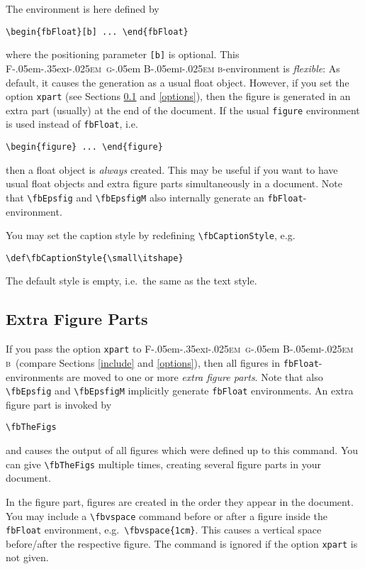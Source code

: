 \documentclass{ltxdoc}
\def\FigBib{{\rmfamily F\kern-.05em\lower-.35ex\hbox{\textsc{i\kern-.025em g}}\kern-.05em%
    B\kern-.05em\textsc{i\kern-.025em b}}}
\begin{document}
The environment is here defined by
\begin{verbatim}
\begin{fbFloat}[b] ... \end{fbFloat}
\end{verbatim}
where the positioning parameter \texttt{[b]} is optional. This
\FigBib-environment is \emph{flexible}: As default, it causes the
generation as a usual float object. However, if you set the option
\texttt{xpart} (see Sections \ref{xpart} and \ref{options}), then
the figure is generated in an extra part (usually) at the end of
the document. If the usual \texttt{figure} environment is used
instead of \texttt{fbFloat}, i.e.
\begin{verbatim}
\begin{figure} ... \end{figure}
\end{verbatim}
then a float object is \emph{always} created. This may be useful
if you want to have usual float objects and extra figure parts
simultaneously in a document. Note that \verb+\fbEpsfig+ and
\verb+\fbEpsfigM+ also internally generate an
\texttt{fbFloat}-environment.

\DescribeMacro{\fbCaptionStyle}
You may set the caption style by redefining
\verb+\fbCaptionStyle+, e.g.
\begin{verbatim}
\def\fbCaptionStyle{\small\itshape}
\end{verbatim}
The default style is empty, i.e.\ the same as the text style.

\subsection{Extra Figure Parts}\label{xpart}

\DescribeMacro{\fbTheFigs}
If you pass the option \texttt{xpart} to \FigBib\ (compare
Sections \ref{include} and \ref{options}), then all figures in
\texttt{fbFloat}-environments are moved to one or more \emph{extra
figure parts}. Note that also \verb+\fbEpsfig+ and
\verb+\fbEpsfigM+ implicitly generate \texttt{fbFloat} environments. An
extra figure part is invoked by
\begin{verbatim}
\fbTheFigs
\end{verbatim}
and causes the output of all figures which were defined up to this
command. You can give \verb+\fbTheFigs+ multiple times, creating
several figure parts in your document.

\DescribeMacro{\fbvspace}
In the figure part, figures are created in the order they appear
in the document. You may include a \verb+\fbvspace+ command before
or after a figure inside the \texttt{fbFloat} environment, e.g.\
\verb+\fbvspace{1cm}+. This causes a vertical space before/after
the respective figure. The command is ignored if the option
\texttt{xpart} is not given.
\end{document}
